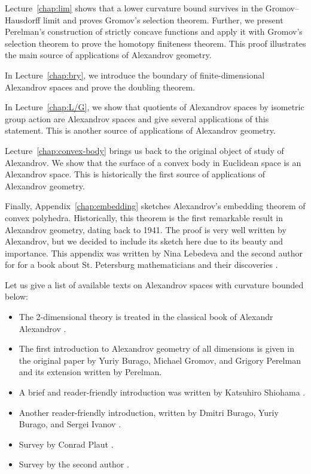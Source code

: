 Lecture~\ref{chap:lim} shows that a lower curvature bound survives in the Gromov--Hausdorff limit and proves Gromov's selection theorem.
Further, we present Perelman's construction of strictly concave functions and apply it with Gromov's selection theorem to prove the homotopy finiteness theorem.
This proof illustrates the main source of applications of Alexandrov geometry.

In Lecture~\ref{chap:bry}, we introduce the boundary of finite-dimensional Alexandrov spaces and prove the doubling theorem.

In Lecture~\ref{chap:L/G}, we show that quotients of Alexandrov spaces by isometric group action are Alexandrov spaces and give several applications of this statement.
This is another source of applications of Alexandrov geometry.

Lecture~\ref{chap:convex-body} brings us back to the original object of study of Alexandrov.
We show that the surface of a convex body in Euclidean space is an Alexandrov space.
This is historically the first source of applications of Alexandrov geometry.

Finally, Appendix~\ref{chap:embedding} sketches Alexandrov's embedding theorem of convex polyhedra.
Historically, this theorem is the first remarkable result in Alexandrov geometry, dating back to 1941.
The proof is very well written by Alexandrov, but we decided to include its sketch here due to its beauty and importance.
This appendix was written by Nina Lebedeva and the second author for  for a book about St. Petersburg mathematicians and their discoveries \cite{lebedeva-petrunin}.

Let us give a list of available texts on Alexandrov spaces with curvature bounded below: 
\begin{itemize}
\item The 2-dimensional theory is treated in the classical book of Alexandr Alexandrov \cite{alexandrov-1948}.
\item The first introduction to Alexandrov geometry of all dimensions is given in the original paper by Yuriy Burago, Michael Gromov, and Grigory Perelman \cite{burago-gromov-perelman} 
and its extension \cite{perelman1991} written by Perelman.
\item A brief and reader-friendly introduction was written by Katsuhiro Shiohama \cite[Sections 1--8]{shiohama}.
\item Another reader-friendly introduction, written by Dmitri Burago, Yuriy
Burago, and Sergei Ivanov \cite[Chapter 10]{burago-burago-ivanov}.
\item Survey by Conrad Plaut \cite{plaut:survey}.
\item Survey by the second author \cite{petrunin:survey}.
\end{itemize}

